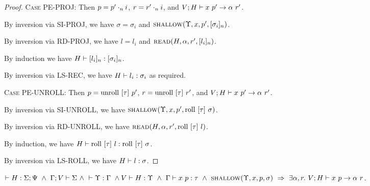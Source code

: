 \documentclass{article}
\begin{document}
\begin{proof}
  \textsc{Case PE-PROJ}:
    Then $p = {p'}\cdot_{n} {i}$, $r = {r'}\cdot_{n} {i}$, and ${{V};{H}} \vdash {{x}\ {p'}} \rightarrow {{\alpha}\ {r'}}$.

    By inversion via \textsc{SI-PROJ}, we have $\sigma = \sigma_i$ and
    $\textsc{shallow}({\Upsilon},{x},{p'},{[ {\sigma_i} ]_{n}})$.

    By inversion via \textsc{RD-PROJ}, we have $l = l_i$ and $\textsc{read}({H},{\alpha},{r'},{[ {l_i} ]_{n}})$.

    By induction we have ${H} \vdash {[ {l_i} ]_{n}} : {[ {\sigma_i} ]_{n}}$.

    By inversion via \textsc{LS-REC}, we have ${H} \vdash {l_i} : {\sigma_i}$ as required.

  \textsc{Case PE-UNROLL}:
    Then $p = \textrm{unroll}\ [{\tau}]\ {p'}$, $r = \textrm{unroll}\ [{\tau}]\ {r'}$, and ${{V};{H}} \vdash {{x}\ {p'}} \rightarrow {{\alpha}\ {r'}}$.

    By inversion via \textsc{SI-UNROLL},
    we have $\textsc{shallow}({\Upsilon},{x},{p'},{\textrm{roll}\ [{\tau}]\ {\sigma}})$.

    By inversion via \textsc{RD-UNROLL},
    we have $\textsc{read}({H},{\alpha},{r'},{\textrm{roll}\ [{\tau}]\ {l}})$.

    By induction, we have ${H} \vdash {\textrm{roll}\ [{\tau}]\ {l}} : {\textrm{roll}\ [{\tau}]\ {\sigma}}$.

    By inversion via \textsc{LS-ROLL}, we have ${H} \vdash {l} : {\sigma}$.

\end{proof}

\begin{lem}
  $\HWF{H}{\Sigma}{\Psi}\ \land\ \SWF{\Gamma}{V}{\Sigma}\ \land\
   \YWF{\Upsilon}{\Gamma}\ \land\ \\ \Type{V}{H}{\Upsilon}\ \land\ 
   \PType{\Gamma}{x}{p}{\tau}\ \land\ \Shallow{\Upsilon}{x}{p}{\sigma}\ 
   \Rightarrow\ \exists \alpha, r.\ \PEval{V}{H}{x}{p}{\alpha}{r}$.
\end{lem}
\end{document}
